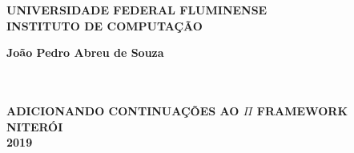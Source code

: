 \thispagestyle{empty}

\vfill
 \begin{center}
    

    {\large\bfseries UNIVERSIDADE FEDERAL FLUMINENSE} \\
    
   
    {\large\bfseries INSTITUTO DE COMPUTAÇÃO}  \\ 

    \vspace*{1in}
    \begin{large} \bfseries João Pedro Abreu de Souza \end{large}\\[0.4in]

    \vspace*{4cm}
    \noindent \\
    
    \large\bfseries{ADICIONANDO CONTINUAÇÕES AO $\Pi$ FRAMEWORK} \\
    \vfill
    \large\bfseries{NITERÓI \\ 2019}
\end{center}

\normalsize


